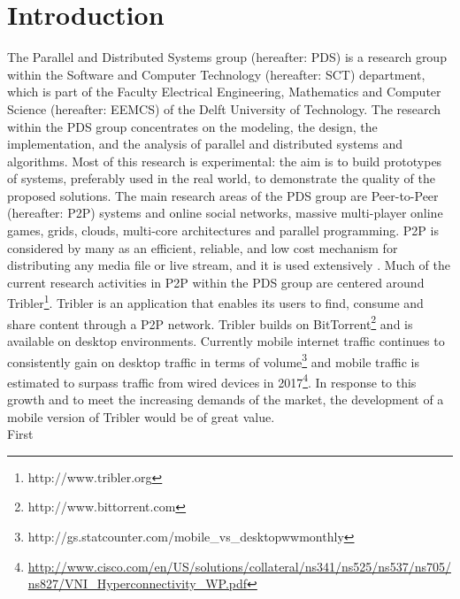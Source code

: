 \part{Introduction}
The Parallel and Distributed Systems group (hereafter: PDS) is a research group within the Software and Computer Technology (hereafter: SCT) department, which is part of the Faculty Electrical Engineering, Mathematics and Computer Science (hereafter: EEMCS) of the Delft University of Technology. The research within the PDS group concentrates on the modeling, the design, the implementation, and the analysis of parallel and distributed systems and algorithms. Most of this research is experimental: the aim is to build prototypes of systems, preferably used in the real world, to demonstrate the quality of the proposed solutions. The main research areas of the PDS group are Peer-to-Peer (hereafter: P2P) systems and online social networks, massive multi-player online games, grids, clouds, multi-core architectures and parallel programming. 
P2P is considered by many as an efficient, reliable, and low cost mechanism for distributing any media file or live stream, and it is used extensively \cite{internet_study}. Much of the current research activities in P2P within the PDS group are centered around Tribler\footnote{http://www.tribler.org}. Tribler is an application that enables its users to find, consume and share content through a P2P network. Tribler builds on BitTorrent\footnote{http://www.bittorrent.com} and is available on desktop environments. Currently mobile internet traffic continues to consistently gain on desktop traffic in terms of volume\footnote{http://gs.statcounter.com/mobile\_vs\_desktop\-ww\-monthly} and mobile traffic is estimated to surpass traffic from wired devices in 2017\footnote{\url{http://www.cisco.com/en/US/solutions/collateral/ns341/ns525/ns537/ns705/ns827/VNI\_Hyperconnectivity\_WP.pdf}}. In response to this growth and to meet the increasing demands of the market, the development of a mobile version of Tribler would be of great value. \\

First 
